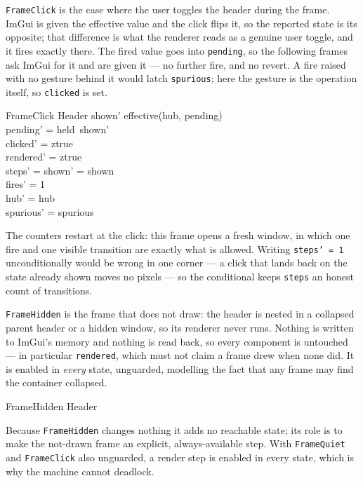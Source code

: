 \documentclass[a4paper,10pt,fleqn]{article}
\begin{document}
\texttt{FrameClick} is the case where the user toggles the header during the
frame.  ImGui is given the effective value and the click flips it, so the
reported state is its opposite; that difference is what the renderer reads as a
genuine user toggle, and it fires exactly there.  The fired value goes into
\texttt{pending}, so the following frames ask ImGui for it and are given it ---
no further fire, and no revert.  A fire raised with no gesture behind it would
latch \texttt{spurious}; here the gesture is the operation itself, so
\texttt{clicked} is set.

\begin{schema}{FrameClick}
  \Delta Header
\where
  shown' \neq effective(hub, pending) \\
  pending' = held~shown' \\
  clicked' = ztrue \\
  rendered' = ztrue \\
  steps' = \IF shown' = shown   \\
  fires' = 1 \\
  hub' = hub \\
  spurious' = spurious
\end{schema}

The counters restart at the click: this frame opens a fresh window, in which
one fire and one visible transition are exactly what is allowed.  Writing
\texttt{steps' = 1} unconditionally would be wrong in one corner --- a click
that lands back on the state already shown moves no pixels --- so the
conditional keeps \texttt{steps} an honest count of transitions.

\texttt{FrameHidden} is the frame that does not draw: the header is nested in a
collapsed parent header or a hidden window, so its renderer never runs.
Nothing is written to ImGui's memory and nothing is read back, so every
component is untouched --- in particular \texttt{rendered}, which must not
claim a frame drew when none did.  It is enabled in \emph{every} state,
unguarded, modelling the fact that any frame may find the container collapsed.

\begin{schema}{FrameHidden}
  \Xi Header
\end{schema}

Because \texttt{FrameHidden} changes nothing it adds no reachable state; its
role is to make the not-drawn frame an explicit, always-available step.  With
\texttt{FrameQuiet} and \texttt{FrameClick} also unguarded, a render step is
enabled in every state, which is why the machine cannot deadlock.
\end{document}
